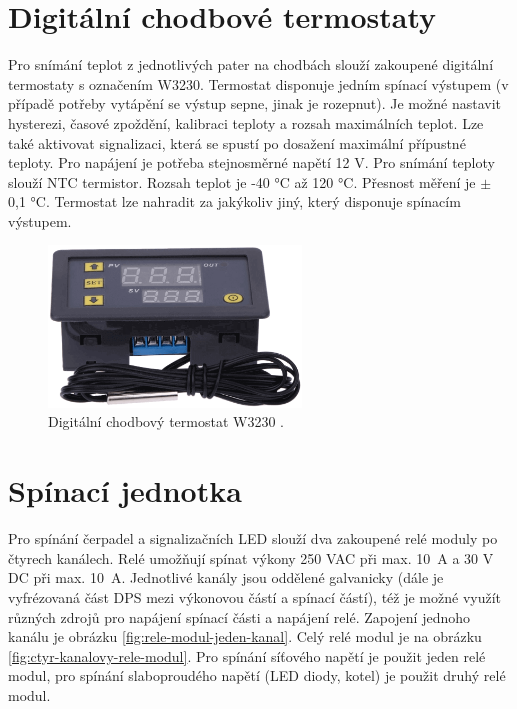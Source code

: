 





\section{Digitální chodbové termostaty}
\label{sec:digitalni-chodbove-termostaty}
Pro snímání teplot z jednotlivých pater na chodbách slouží zakoupené digitální termostaty s označením W3230. Termostat disponuje jedním spínací výstupem (v případě potřeby vytápění se výstup sepne, jinak je rozepnut). Je možné nastavit hysterezi, časové zpoždění, kalibraci teploty a rozsah maximálních teplot. Lze také aktivovat signalizaci, která se spustí po dosažení maximální přípustné teploty. Pro napájení je potřeba stejnosměrné napětí 12 V. Pro snímání teploty slouží NTC termistor. Rozsah teplot je -40 °C až 120 °C. Přesnost měření je $\pm$ 0,1 °C. Termostat lze nahradit za jakýkoliv jiný, který disponuje spínacím výstupem.


\begin{figure}[H]
    \centering
    \includegraphics[width=0.6\textwidth]{images/digitalni-termostat-w3230.png}
    \caption[Digitální chodbový termostat W3230.]{Digitální chodbový termostat W3230 \cite{digitalni-termostat-w3230}.}
    \label{fig:digitalni-termostat-w3230}
\end{figure}


\section{Spínací jednotka}
Pro spínání čerpadel a signalizačních LED slouží dva zakoupené relé moduly po čtyrech kanálech. Relé umožňují spínat výkony 250 VAC při max. 10~A a 30 V DC při max. 10~A. Jednotlivé kanály jsou oddělené galvanicky (dále je vyfrézovaná část DPS mezi výkonovou částí a spínací částí), též je možné využít různých zdrojů pro napájení spínací části a napájení relé. Zapojení jednoho kanálu je obrázku \ref{fig:rele-modul-jeden-kanal}. Celý relé modul je na obrázku \ref{fig:ctyr-kanalovy-rele-modul}. Pro spínání síťového napětí je použit jeden relé modul, pro spínání slaboproudého napětí (LED diody, kotel) je použit druhý relé modul.

